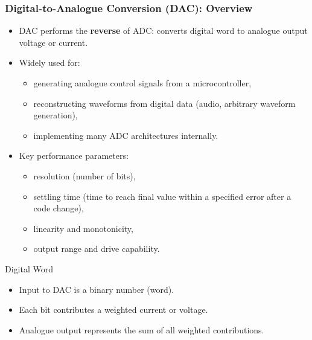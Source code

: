 \begin{frame}
	\frametitle{Digital-to-Analogue Conversion (DAC): Overview}
	\begin{itemize}
		\item DAC performs the \textbf{reverse} of ADC: converts digital word to analogue output voltage or current.
		\item Widely used for:
		\begin{itemize}
			\item generating analogue control signals from a microcontroller,
			\item reconstructing waveforms from digital data (audio, arbitrary waveform generation),
			\item implementing many ADC architectures internally.
		\end{itemize}
		\item Key performance parameters:
		\begin{itemize}
			\item resolution (number of bits),
			\item settling time (time to reach final value within a specified error after a code change),
			\item linearity and monotonicity,
			\item output range and drive capability.
		\end{itemize}
	\end{itemize}
	\begin{block}{Digital Word}
		\begin{itemize}
			\item Input to DAC is a binary number (word).
			\item Each bit contributes a weighted current or voltage.
			\item Analogue output represents the sum of all weighted contributions.
		\end{itemize}
	\end{block}
\end{frame}
